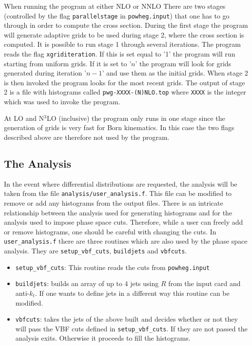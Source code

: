 \documentclass[12pt,a4]{article}
\begin{document}
When running the program at either NLO or NNLO There are two stages
(controlled by the flag \texttt{parallelstage} in
\texttt{powheg.input}) that one has to go through in order to compute
the cross section.
%
During the first stage the program will generate adaptive grids to be
used during stage 2, where the cross section is computed.
%
It is possible to run stage 1 through several iterations.
%
The program reads the flag \texttt{xgriditeration}.
%
If this is set equal to '1' the program will run starting from uniform
grids.
%
If it is set to '$n$' the program will look for grids generated during
iteration '$n-1$' and use them as the initial grids.
%
When stage 2 is then invoked the program looks for the most recent
grids.
%
The output of stage 2 is a file with histograms called
\texttt{pwg-XXXX-(N)NLO.top} where \texttt{XXXX} is the integer which
was used to invoke the program.

At LO and N$^3$LO (inclusive) the program only runs in one stage since
the generation of grids is very fast for Born kinematics.
%
In this case the two flags described above are therefore not used by
the program.

\subsection{The Analysis}
In the event where differential distributions are requested, the
analysis will be taken from the file
\texttt{analysis/user\_analysis.f}.
%
This file can be modified to remove or add any histograms from the
output files.
%
There is an intricate relationship between the analysis used for
generating histograms and for the analysis used to impose phase space
cuts.
%
Therefore, while a user can freely add or remove histograms, one
should be careful with changing the cuts.
%
In \texttt{user\_analysis.f} there are three routines which are also
used by the phase space analysis.
%
They are \texttt{setup\_vbf\_cuts}, \texttt{buildjets} and
\texttt{vbfcuts}.

\begin{itemize}
  \item \texttt{setup\_vbf\_cuts}: This routine reads the cuts from
    \texttt{powheg.input}
  \item \texttt{buildjets}: builds an array of up to 4 jets using $R$
    from the input card and anti-$k_t$. If one wants to define jets in
    a different way this routine can be modified.
  \item \texttt{vbfcuts}: takes the jets of the above built and
    decides whether or not they will pass the VBF cuts defined in
    \texttt{setup\_vbf\_cuts}. If they are not passed the analysis
    exits. Otherwise it proceeds to fill the histograms.
\end{itemize}
\end{document}
